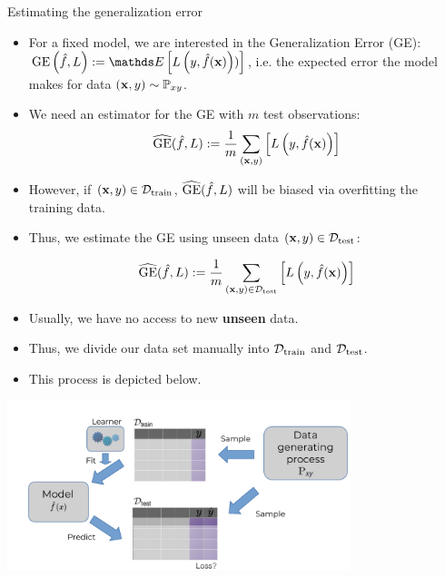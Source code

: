 \documentclass[11pt,compress,t,notes=noshow, xcolor=table]{beamer}
\begin{document}
\begin{vbframe}{Estimating the generalization error}

\begin{itemize}
\item For a fixed model, we are interested in the Generalization Error (GE): $\GEfL := \E \left[ \Lyfhx) \right]$, i.e. the expected error the model makes for data $(\mathbf{x}, y) \sim \mathbb{P}_{xy}$.
\item We need an estimator for the GE with $m$ test observations: $$\widehat{\mathrm{GE}}(\hat{f}, L) := \frac{1}{m}\sum_{(\mathbf{x}, y)} \left[ L\left(y, \hat{f}(\mathbf{x})\right) \right]$$
\item However, if $(\mathbf{x}, y) \in \mathcal{D}_{\text{train}}$, $\widehat{\mathrm{GE}}(\hat{f}, L)$ will be biased via overfitting the training data.
\item Thus, we estimate the GE using unseen data $(\mathbf{x}, y) \in \mathcal{D}_{\text{test}}$:

 $$\widehat{\mathrm{GE}}(\hat{f}, L) := \frac{1}{m}\sum_{(\mathbf{x}, y) \in \mathcal{D}_{\text{test}}} \left[ L\left(y, \hat{f}(\mathbf{x})\right) \right]$$

\end{itemize}

\framebreak

\begin{itemize}
\item Usually, we have no access to new \textbf{unseen} data.
\item Thus, we divide our data set manually into $\mathcal{D}_{\text{train}}$ and $\mathcal{D}_{\text{test}}$.
\item This process is depicted below.
\end{itemize}

\begin{center}
\includegraphics[trim = 0 0 0 30, clip, width=0.75\textwidth]
{figure_man/evaluation-intro-ge.pdf}
\end{center}

\end{vbframe}
\end{document}
